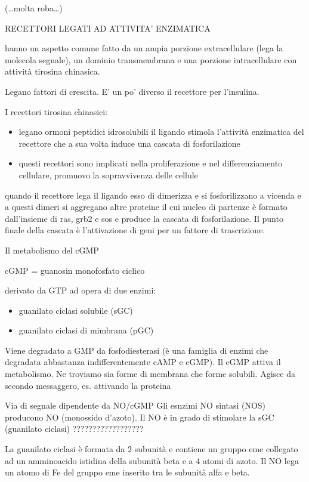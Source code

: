 \documentclass[]{article}
\begin{document}
(\ldots{}molta roba\ldots{})

RECETTORI LEGATI AD ATTIVITA' ENZIMATICA

hanno un aspetto comune fatto da un ampia porzione extracellulare (lega
la molecola segnale), un dominio transmembrana e una porzione
intracellulare con attività tirosina chinasica.

Legano fattori di crescita. E' un po' diverso il recettore per
l'insulina.

I recettori tirosina chinasici:

\begin{itemize}
\itemsep1pt\parskip0pt
\item
  legano ormoni peptidici idrosolubili il ligando stimola l'attività
  enzimatica del recettore che a sua volta induce una cascata di
  fosforilazione
\item
  questi recettori sono implicati nella proliferazione e nel
  differenziamento cellulare, promuovo la sopravvivenza delle cellule
\end{itemize}

quando il recettore lega il ligando esso di dimerizza e si
fosforilizzano a vicenda e a questi dimeri si aggregano altre proteine
il cui nucleo di partenze è formato dall'insieme di ras, grb2 e sos e
produce la cascata di fosforilazione. Il punto finale della cascata è
l'attivazione di geni per un fattore di trascrizione.

Il metabolismo del cGMP

cGMP = guanosin monofosfato ciclico

derivato da GTP ad opera di due enzimi:

\begin{itemize}
\itemsep1pt\parskip0pt
\item
  guanilato ciclasi solubile (sGC)
\item
  guanilato ciclasi di mimbrana (pGC)
\end{itemize}

Viene degradato a GMP da fosfodiesterasi (è una famiglia di enzimi che
degradata abbastanza indifferentemente cAMP e cGMP). Il cGMP attiva il
metabolismo. Ne troviamo sia forme di membrana che forme solubili.
Agisce da secondo messaggero, es. attivando la proteina

Via di segnale dipendente da NO/cGMP Gli esnzimi NO sintasi (NOS)
producono NO (monossido d'azoto). Il NO è in grado di stimolare la sGC
(guanilato ciclasi) ??????????????????

La guanilato ciclasi è formata da 2 subunità e contiene un gruppo eme
collegato ad un amminoacido istidina della subunità beta e a 4 atomi di
azoto. Il NO lega un atomo di Fe del gruppo eme inserito tra le subunità
alfa e beta.
\end{document}
